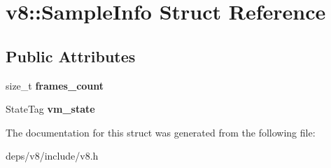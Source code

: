 \hypertarget{structv8_1_1_sample_info}{}\section{v8\+:\+:Sample\+Info Struct Reference}
\label{structv8_1_1_sample_info}
\subsection*{Public Attributes}
\begin{DoxyCompactItemize}
\item 
\hypertarget{structv8_1_1_sample_info_a5f1e51bc358605e0c1d38fb2f3d344cd}{}size\+\_\+t {\bfseries frames\+\_\+count}\label{structv8_1_1_sample_info_a5f1e51bc358605e0c1d38fb2f3d344cd}

\item 
\hypertarget{structv8_1_1_sample_info_afd6198c9feb44a8df79576cf427b9a91}{}State\+Tag {\bfseries vm\+\_\+state}\label{structv8_1_1_sample_info_afd6198c9feb44a8df79576cf427b9a91}

\end{DoxyCompactItemize}


The documentation for this struct was generated from the following file\+:\begin{DoxyCompactItemize}
\item 
deps/v8/include/v8.\+h\end{DoxyCompactItemize}
